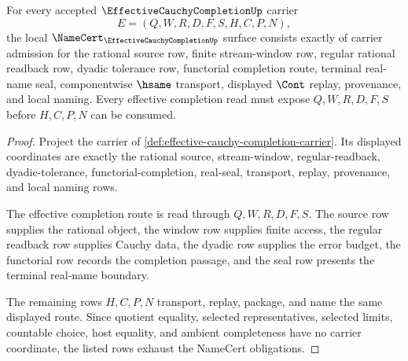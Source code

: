 \begin{theorem}\label{thm:effective-cauchy-completion-namecert-obligations}
For every accepted $\EffectiveCauchyCompletionUp$ carrier
$$
E=(Q,W,R,D,F,S,H,C,P,N),
$$
the local $\NameCert_{\EffectiveCauchyCompletionUp}$ surface consists exactly of carrier admission for the rational source row, finite stream-window row, regular rational readback row, dyadic tolerance row, functorial completion route, terminal real-name seal, componentwise $\hsame$ transport, displayed $\Cont$ replay, provenance, and local naming. Every effective completion read must expose $Q,W,R,D,F,S$ before $H,C,P,N$ can be consumed.
\end{theorem}
\begin{proof}
Project the carrier of \autoref{def:effective-cauchy-completion-carrier}. Its displayed coordinates are exactly the rational source, stream-window, regular-readback, dyadic-tolerance, functorial-completion, real-seal, transport, replay, provenance, and local naming rows.

The effective completion route is read through $Q,W,R,D,F,S$. The source row supplies the rational object, the window row supplies finite access, the regular readback row supplies Cauchy data, the dyadic row supplies the error budget, the functorial row records the completion passage, and the seal row presents the terminal real-name boundary.

The remaining rows $H,C,P,N$ transport, replay, package, and name the same displayed route. Since quotient equality, selected representatives, selected limits, countable choice, host equality, and ambient completeness have no carrier coordinate, the listed rows exhaust the NameCert obligations.
\end{proof}

